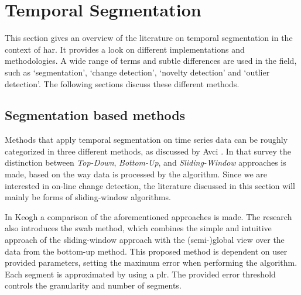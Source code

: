 \section{Temporal Segmentation}\label{sec:literature_review_temporal_segmentation}




This section gives an overview of the literature on temporal segmentation in the context of \gls{har}.
It provides a look on different implementations and methodologies.
A wide range of terms and subtle differences are used in the field, such as `segmentation', `change detection', `novelty detection' and `outlier detection'.
The following sections discuss these different methods.

\subsection{Segmentation based methods}\label{subsec:segmentation}

Methods that apply temporal segmentation on time series data can be roughly categorized in three different methods, as discussed by Avci \etal \cite{avci2010activity}.
In that survey the distinction between \emph{Top-Down}, \emph{Bottom-Up}, and \emph{Sliding-Window} approaches is made, based on the way data is processed by the algorithm.
Since we are interested in on-line change detection, the literature discussed in this section will mainly be forms of sliding-window algorithms.

In Keogh \etal \cite{keogh2001online} a comparison of the aforementioned approaches is made.
The research also introduces the \gls{swab} method, which combines the simple and intuitive approach of the sliding-window approach with the (semi-)global view over the data from the bottom-up method.
This proposed method is dependent on user provided parameters, setting the maximum error when performing the algorithm.
Each segment is approximated by using a \gls{plr}.
The provided error threshold controls the granularity and number of segments.

